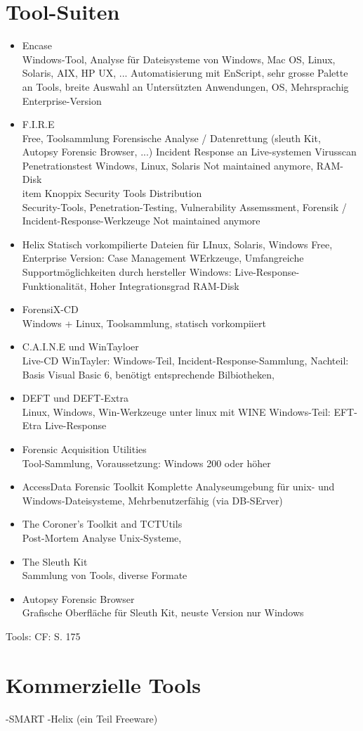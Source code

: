 \section{Tool-Suiten}
\begin{itemize}
\item Encase \\
Windows-Tool, Analyse für Dateisysteme von Windows, Mac OS, Linux, Solaris, AIX, HP UX, ...
Automatisierung mit EnScript, sehr grosse Palette an Tools, breite Auswahl an Untersützten Anwendungen, OS, Mehrsprachig
Enterprise-Version
\item F.I.R.E\\
Free, Toolsammlung
Forensische Analyse / Datenrettung (sleuth Kit, Autopsy Forensic Browser, ...)
Incident Response an Live-systemen
Virusscan
Penetrationstest
Windows, Linux, Solaris
Not maintained anymore,
RAM-Disk
\\item Knoppix Security Tools Distribution\\
Security-Tools, Penetration-Testing, Vulnerability Assemssment, Forensik / Incident-Response-Werkzeuge
Not maintained anymore
\item Helix
Statisch vorkompilierte Dateien für LInux, Solaris, Windows
Free, Enterprise Version: Case Management WErkzeuge, Umfangreiche Supportmöglichkeiten durch hersteller
Windows: Live-Response-Funktionalität, Hoher Integrationsgrad
RAM-Disk
\item ForensiX-CD\\
Windows + Linux, Toolsammlung, statisch vorkompiiert
\item C.A.I.N.E und WinTayloer \\
Live-CD
WinTayler: Windows-Teil, Incident-Response-Sammlung, Nachteil: Basis Visual Basic 6, benötigt entsprechende Bilbiotheken, 
\item DEFT und DEFT-Extra\\
Linux, Windows, Win-Werkzeuge unter linux mit WINE
Windows-Teil: EFT-Etra
Live-Response
\item Forensic Acquisition Utilities \\
Tool-Sammlung, Voraussetzung: Windows 200 oder höher
\item AccessData Forensic Toolkit
Komplette Analyseumgebung für unix- und Windows-Dateisysteme, Mehrbenutzerfähig (via DB-SErver)
\item The Coroner's Toolkit and TCTUtils\\
Post-Mortem Analyse Unix-Systeme, 
\item The Sleuth Kit\\
Sammlung von Tools, diverse Formate
\item Autopsy Forensic Browser\\
Grafische Oberfläche für Sleuth Kit, neuste Version nur Windows
\end{itemize}


Tools: CF: S. 175



\section{Kommerzielle Tools}
-SMART
-Helix (ein Teil Freeware)
